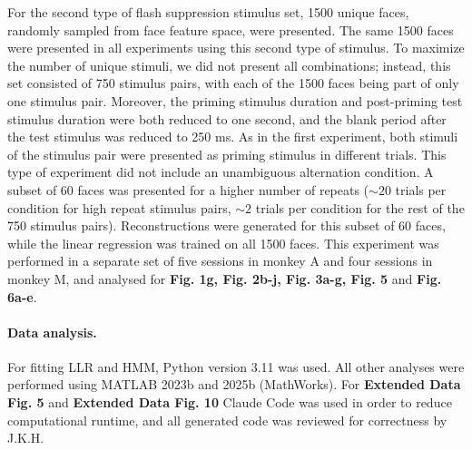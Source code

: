 \documentclass{article}
\begin{document}
For the second type of flash suppression stimulus set, 1500 unique faces, randomly sampled from face feature space, were presented. The same 1500 faces were presented in all experiments using this second type of stimulus. To maximize the number of unique stimuli, we did not present all combinations; instead, this set consisted of 750 stimulus pairs, with each of the 1500 faces being part of only one stimulus pair. Moreover, the priming stimulus duration and post-priming test stimulus duration were both reduced to one second, and the blank period after the test stimulus was reduced to 250 ms. As in the first experiment, both stimuli of the stimulus pair were presented as priming stimulus in different trials. This type of experiment did not include an unambiguous alternation condition. A subset of 60 faces was presented for a higher number of repeats (${\sim}20$ trials per condition for high repeat stimulus pairs, ${\sim}2$ trials per condition for the rest of the 750 stimulus pairs). Reconstructions were generated for this subset of 60 faces, while the linear regression was trained on all 1500 faces. This experiment was performed in a separate set of five sessions in monkey A and four sessions in monkey M, and analysed for \textbf{Fig. 1g, Fig. 2b-j, Fig. 3a-g, Fig. 5} and \textbf{Fig. 6a-e}.

\paragraph{Data analysis.} For fitting LLR and HMM, Python version 3.11 was used. All other analyses were performed using MATLAB 2023b and 2025b (MathWorks). For \textbf{Extended Data Fig. 5} and \textbf{Extended Data Fig. 10} Claude Code was used in order to reduce computational runtime, and all generated code was reviewed for correctness by J.K.H.
\end{document}
